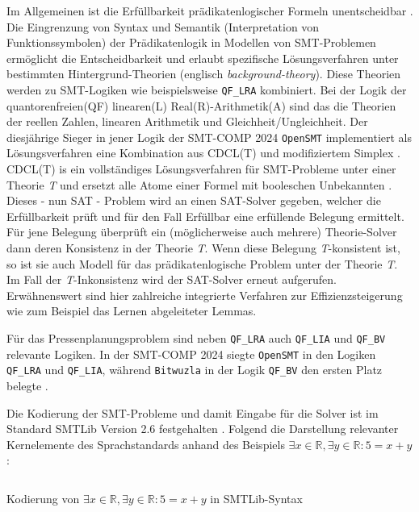 Im Allgemeinen ist die Erfüllbarkeit prädikatenlogischer Formeln unentscheidbar \cite{smt}.
Die Eingrenzung von Syntax und Semantik (Interpretation von Funktionssymbolen) der Prädikatenlogik in Modellen von SMT-Problemen
ermöglicht die Entscheidbarkeit und erlaubt spezifische Lösungsverfahren unter bestimmten Hintergrund-Theorien (englisch \textit{background-theory}).
Diese Theorien werden zu \gls{SMT-Logik}en wie beispielsweise \texttt{QF\_LRA} kombiniert.
Bei der Logik der quantorenfreien(QF) linearen(L) Real(R)-Arithmetik(A) sind das die Theorien der reellen Zahlen, linearen Arithmetik und Gleichheit/Ungleichheit.
Der diesjährige Sieger in jener Logik der SMT-COMP 2024 \texttt{OpenSMT} \cite{smtcomp2024results} implementiert als Lösungsverfahren eine Kombination aus CDCL(T) und modifiziertem Simplex \cite{opensmt}.
\gls{CDCL(T)} is ein vollständiges Lösungsverfahren für SMT-Probleme unter einer Theorie \textit{T} und ersetzt alle Atome einer Formel mit booleschen Unbekannten \cite{smt}.
Dieses - nun SAT - Problem wird an einen \gls{SAT-Solver} gegeben, welcher die Erfüllbarkeit prüft und für den Fall Erfüllbar eine erfüllende Belegung ermittelt.
Für jene Belegung überprüft ein (möglicherweise auch mehrere) Theorie-Solver dann deren Konsistenz in der Theorie \textit{T}.
Wenn diese Belegung \textit{T}-konsistent ist, so ist sie auch Modell für das prädikatenlogische Problem unter der Theorie \textit{T}.
Im Fall der \textit{T}-Inkonsistenz wird der SAT-Solver erneut aufgerufen.
Erwähnenswert sind hier zahlreiche integrierte Verfahren zur Effizienzsteigerung wie zum Beispiel das Lernen abgeleiteter Lemmas.

Für das Pressenplanungsproblem sind neben \texttt{QF\_LRA} auch \texttt{QF\_LIA} und \texttt{QF\_BV} relevante Logiken.
In der SMT-COMP 2024 siegte \texttt{OpenSMT} in den Logiken \texttt{QF\_LRA} und \texttt{QF\_LIA}, während \texttt{Bitwuzla} in der Logik \texttt{QF\_BV} den ersten Platz belegte \cite{smtcomp2024results}.

Die Kodierung der SMT-Probleme und damit Eingabe für die Solver ist im Standard SMTLib Version 2.6 festgehalten \cite{smtlib}.
Folgend die Darstellung relevanter Kernelemente des Sprachstandards anhand des Beispiels
$\exists x \in \mathbb{R}, \exists y \in \mathbb{R}: 5 = x + y$:

\begin{listing}[H]
    \inputminted[linenos=true]{bash}{Code/SMT/SMTLibSimple.smt2}
    \caption{Kodierung von $\exists x \in \mathbb{R}, \exists y \in \mathbb{R}: 5 = x + y$ in SMTLib-Syntax}
    \label{listing:smtlibsimple}
\end{listing}

